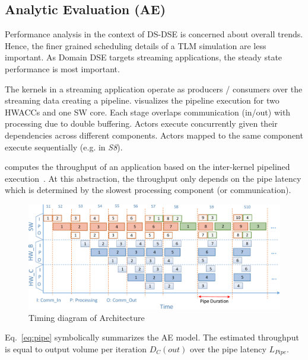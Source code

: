 \subsection{Analytic Evaluation (AE)}
\label{sec:Ana}

Performance analysis in the context of DS-DSE is concerned about overall trends. Hence, the finer grained scheduling details of a TLM simulation are less important. As Domain DSE targets streaming applications, the steady state performance is most important. 

The kernels in a streaming application operate as producers / consumers over the streaming data creating a pipeline.  visualizes the pipeline execution for two HWACCs and one SW core. Each stage overlaps communication (in/out) with processing due to double buffering. Actors execute concurrently given their dependencies across different components. Actors mapped to the same component execute sequentially (e.g. in \emph{S8}).

 computes the throughput of an application based on the inter-kernel pipelined execution~\cite{Teimouri_TCAD_2018}.
At this abstraction, the throughput only depends on the pipe latency which is determined by the slowest processing component (or communication).

\begin{figure}[h]
	\centering
	\includegraphics[width=\linewidth]{fig/pPipe.pdf}
	\caption{Timing diagram of Architecture}
	\label{fig:Pipe}
	
\end{figure}


Eq.~\eqref{eq:pipe} symbolically summarizes the AE model. The estimated throughput is equal to output volume per iteration $D_{C}(out)$ over the pipe latency $L_{Pipe}$. 

